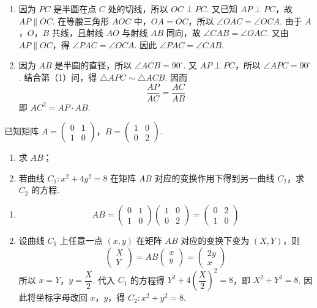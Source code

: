 \begin{solution}
\begin{enumerate}
\item 因为 \(PC\) 是半圆在点 \(C\) 处的切线，所以 \(OC\perp PC\). 又已知 \(AP\perp PC\)，故 \(AP\parallel OC\). 在等腰三角形 \(AOC\) 中，\(OA=OC\)，所以 \(\angle OAC=\angle OCA\). 由于 \(A\)，\(O\)，\(B\) 共线，且射线 \(AO\) 与射线 \(AB\) 同向，故 \(\angle CAB=\angle OAC\). 又由 \(AP\parallel OC\)，得 \(\angle PAC=\angle OCA\). 因此 \(\angle PAC=\angle CAB\).
\item 因为 \(AB\) 是半圆的直径，所以 \(\angle ACB=90^\circ\). 又 \(AP\perp PC\)，所以 \(\angle APC=90^\circ\). 结合第（1）问，得 \(\triangle APC\sim\triangle ACB\). 因而
\[
\dfrac{AP}{AC}=\dfrac{AC}{AB}
\]
即 \(AC^2=AP\cdot AB\).
\end{enumerate}
\end{solution}


\reuseproblemnumber
\begin{problem}[B]
已知矩阵 \(A=\begin{pmatrix}0&1\\1&0\end{pmatrix}\)，\(B=\begin{pmatrix}1&0\\0&2\end{pmatrix}\).

\begin{enumerate}
\item 求 \(AB\)；
\item 若曲线 \(C_1:x^2+4y^2=8\) 在矩阵 \(AB\) 对应的变换作用下得到另一曲线 \(C_2\)，求 \(C_2\) 的方程.
\end{enumerate}
\end{problem}

\begin{solution}
\begin{enumerate}
\item
\[
AB=\begin{pmatrix}0&1\\1&0\end{pmatrix}\begin{pmatrix}1&0\\0&2\end{pmatrix}=\begin{pmatrix}0&2\\1&0\end{pmatrix}
\]
\item 设曲线 \(C_1\) 上任意一点 \((x,y)\) 在矩阵 \(AB\) 对应的变换下变为 \((X,Y)\)，则
\[
\begin{pmatrix}X\\Y\end{pmatrix}=AB\begin{pmatrix}x\\y\end{pmatrix}=\begin{pmatrix}2y\\x\end{pmatrix}
\]
所以 \(x=Y\)，\(y=\dfrac X2\). 代入 \(C_1\) 的方程得 \(Y^2+4\left(\dfrac X2\right)^2=8\)，即 \(X^2+Y^2=8\). 因此将坐标字母改回 \(x\)，\(y\)，得 \(C_2:x^2+y^2=8\).
\end{enumerate}
\end{solution}


